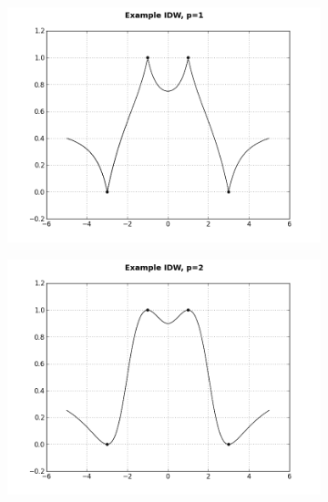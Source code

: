             \begin{figure}[H]
                \centering
                \begin{subfigure}{.5\textwidth}
                    \centering
                    \includegraphics[width=\linewidth]{./images/IDWPF1.png}
                    \caption{}
                    \label{fig:example_idw_p1}
                \end{subfigure}%
                \begin{subfigure}{.5\textwidth}
                    \includegraphics[width=\linewidth]{./images/IDWPF2.png}
                    \caption{}
                    \label{fig:example_idw_p2}
                \end{subfigure}

\end{figure}
